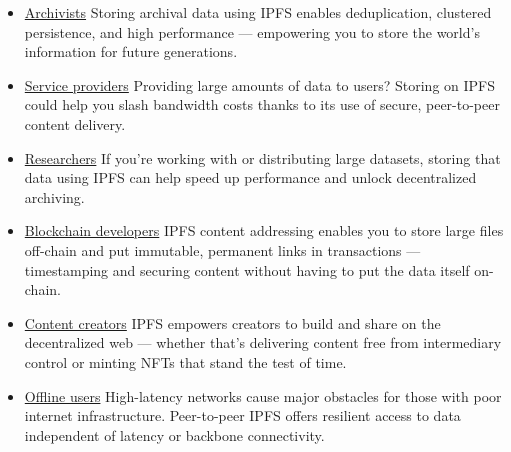 \begin{itemize}
   \item \underline{Archivists}
Storing archival data using IPFS enables deduplication, clustered persistence, and high performance — empowering you to store the world's information for future generations.

\item \underline{Service providers}
Providing large amounts of data to users? Storing on IPFS could help you slash bandwidth costs thanks to its use of secure, peer-to-peer content delivery.

\item \underline{Researchers}
If you're working with or distributing large datasets, storing that data using IPFS can help speed up performance and unlock decentralized archiving.

\item \underline{Blockchain developers}
IPFS content addressing enables you to store large files off-chain and put immutable, permanent links in transactions — timestamping and securing content without having to put the data itself on-chain.

\item \underline{Content creators}
IPFS empowers creators to build and share on the decentralized web — whether that's delivering content free from intermediary control or minting NFTs that stand the test of time.

\item \underline{Offline users}
High-latency networks cause major obstacles for those with poor internet infrastructure. Peer-to-peer IPFS offers resilient access to data independent of latency or backbone connectivity.

\end{itemize}

